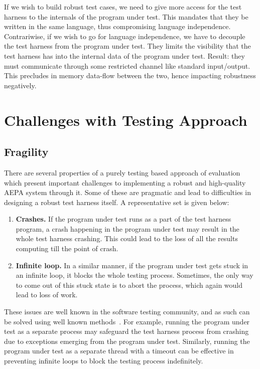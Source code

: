 \documentclass[12pt]{article}
\begin{document}
If we wish to build robust test cases, we need to give more access for the test harness to the internals of the program under test. This mandates that they be written in the same language, thus compromising language independence. Contrariwise, if we wish to go for language independence, we have to decouple the test harness from the program under test. They limits the visibility that the test harness has into the internal data of the program under test. Result: they must communicate through some restricted channel like standard input/output. This precludes in memory data-flow between the two, hence impacting robustness negatively.

\section{Challenges with Testing Approach}
\subsection{Fragility}
There are several properties of a purely testing based approach of evaluation which present important challenges to implementing a robust and high-quality AEPA system through it. Some of these are pragmatic and lead to difficulties in designing a robust test harness itself. A representative set is given below:
\begin{enumerate}
\item \textbf{Crashes.} If the program under test runs as a part of the test harness program, a crash happening in the program under test may result in the whole test harness crashing. This could lead to the loss of all the results computing till the point of crash.
\item \textbf{Infinite loop.} In a similar manner, if the program under test gets stuck in an infinite loop, it blocks the whole testing process. Sometimes, the only way to come out of this stuck state is to abort the process, which again would lead to loss of work.

\end{enumerate}

These issues are well known in the software testing community, and as such can be solved using well known methods~\cite{Ammann:2008:IST:1355340}. For example, running the program under test as a separate process may safeguard the test harness process from crashing due to exceptions emerging from the program under test. Similarly, running the program under test as a separate thread with a timeout can be effective in preventing infinite loops to block the testing process indefinitely.
\end{document}
